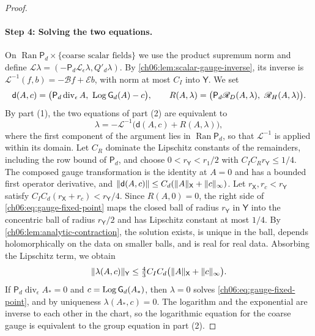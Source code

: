 \begin{proof}
\paragraph{Step 4: Solving the two equations.}
On $\operatorname{Ran}\mathsf P_d\times\{\text{coarse scalar fields}\}$ we use the product supremum norm and define $\mathcal L\lambda=(-\mathsf P_d\mathscr L_\epsilon\lambda,Q'_d\lambda)$. By \cref{ch06:lem:scalar-gauge-inverse}, its inverse is $\mathcal L^{-1}(f,b)=-\mathscr Bf+\mathscr Eb$, with norm at most $C_I$ into $\mathsf Y$. We set
\[
 \mathsf d(A,c)=\bigl(\mathsf P_d\operatorname{div}_\epsilon A,\ \operatorname{Log}\mathsf G_d(A)-c\bigr),\qquad R(A,\lambda)=\bigl(\mathsf P_d\mathscr R_D(A,\lambda),\ \mathscr R_H(A,\lambda)\bigr).
\]
By part (1), the two equations of part (2) are equivalent to
\begin{equation}\label{ch06:eq:gauge-fixed-point}
 \lambda=-\mathcal L^{-1}\bigl(\mathsf d(A,c)+R(A,\lambda)\bigr),
\end{equation}
where the first component of the argument lies in $\operatorname{Ran}\mathsf P_d$, so that $\mathcal L^{-1}$ is applied within its domain. Let $C_R$ dominate the Lipschitz constants of the remainders, including the row bound of $\mathsf P_d$, and choose $0<r_{\mathsf Y}<r_1/2$ with $C_IC_Rr_{\mathsf Y}\le1/4$. The composed gauge transformation is the identity at $A=0$ and has a bounded first operator derivative, and $\lVert \mathsf d(A,c)\rVert\le C_d(\lVert A\rVert_{\mathsf X}+\lVert c\rVert_\infty)$. Let $r_{\mathsf X},r_c<r_{\mathsf Y}$ satisfy $C_IC_d(r_{\mathsf X}+r_c)<r_{\mathsf Y}/4$. Since $R(A,0)=0$, the right side of \eqref{ch06:eq:gauge-fixed-point} maps the closed ball of radius $r_{\mathsf Y}$ in $\mathsf Y$ into the concentric ball of radius $r_{\mathsf Y}/2$ and has Lipschitz constant at most $1/4$. By \cref{ch06:lem:analytic-contraction}, the solution exists, is unique in the ball, depends holomorphically on the data on smaller balls, and is real for real data. Absorbing the Lipschitz term, we obtain
\[
 \lVert \lambda(A,c)\rVert_{\mathsf Y}\le\tfrac43C_IC_d\bigl(\lVert A\rVert_{\mathsf X}+\lVert c\rVert_\infty\bigr).
\]
If $\mathsf P_d\operatorname{div}_\epsilon A_*=0$ and $c=\operatorname{Log}\mathsf G_d(A_*)$, then $\lambda=0$ solves \eqref{ch06:eq:gauge-fixed-point}, and by uniqueness $\lambda(A_*,c)=0$. The logarithm and the exponential are inverse to each other in the chart, so the logarithmic equation for the coarse gauge is equivalent to the group equation in part (2).


\end{proof}
